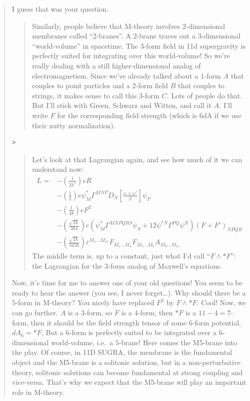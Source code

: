 \documentclass{article}
\begin{document}
\begin{quote}
I guess that was your question.

\begin{quote}
Similarly, people believe that M-theory involves \(2\)-dimensional
membranes called ``2-branes''. A \(2\)-brane traces out a
\(3\)-dimensional ``world-volume'' in spacetime. The \(3\)-form field in
11d supergravity is perfectly suited for integrating over this
world-volume! So we're really dealing with a still higher-dimensional
analog of electromagnetism. Since we've already talked about a
\(1\)-form \(A\) that couples to point particles and a \(2\)-form field
\(B\) that couples to strings, it makes sense to call this \(3\)-form
\(C\). Lots of people do that. But I'll stick with Green, Schwarz and
Witten, and call it \(A\). I'll write \(F\) for the corresponding field
strength (which is 6dA if we use their nutty normalization).
\end{quote}

\begin{verbatim}
>
\end{verbatim}

\begin{quote}
Let's look at that Lagrangian again, and see how much of it we can
understand now: \[
  \begin{aligned}
    L =
    &- \left(\frac{1}{2k^2}\right) eR
  \\&- \left(\frac{1}{2}\right) e\psi_M^* \Gamma^{MNP} D_N\left[\frac{\omega+\omega'}{2}\right]\psi_P
  \\&- \left(\frac{1}{48}\right) eF^2
  \\&- \left(\frac{\sqrt{2k}}{384}\right) e(\psi_M^* \Gamma^{MNPQRS}\psi_S + 12\psi^{*N}\Gamma^{PQ}\psi^R)(F+F')_{NPQR}
  \\&- \left(\frac{\sqrt{2k}}{3456}\right) \varepsilon^{M_1\ldots M_{11}}F_{M_1\ldots M_4}F_{M_5\ldots M_8}A_{M_9\ldots M_{11}}
  \end{aligned}
\] The middle term is, up to a constant, just what I'd call
``\(F\wedge *F\)'': the Lagrangian for the \(3\)-form analog of
Maxwell's equations.
\end{quote}

Now, it's time for me to answer one of your old questions! You seem to
be ready to hear the answer (you see, I never forget\ldots). Why should
there be a \(5\)-form in M-theory? You nicely have replaced \(F^2\) by
\(F\wedge*F\). Cool! Now, we can go further. \(A\) is a \(3\)-form, so
\(F\) is a \(4\)-form, then \(*F\) is a \(11-4=7\)-form, then it should
be the field strength tensor of some \(6\)-form potential, \(dA_6=*F\),
But a \(6\)-form is perfectly suited to be integrated over a
\(6\)-dimensional world-volume, i.e.~a \(5\)-brane! Here comes the
M5-brane into the play. Of course, in 11D SUGRA, the membrane is the
fundamental object and the M5-brane is a solitonic solution, but in a
non-perturbative theory, solitonic solutions can become fundamental at
strong coupling and vice-versa. That's why we expect that the M5-brane
will play an important role in M-theory.


\end{quote}
\end{document}
